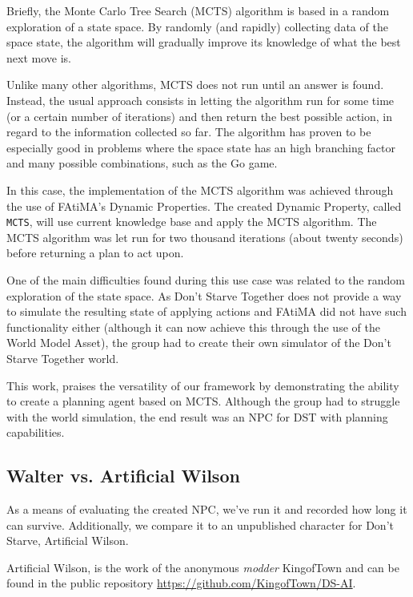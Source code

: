 Briefly, the Monte Carlo Tree Search (MCTS) algorithm is based in a random exploration of a state space.
By randomly (and rapidly) collecting data of the space state, the algorithm will gradually improve its knowledge of what the best next move is.

Unlike many other algorithms, MCTS does not run until an answer is found.
Instead, the usual approach consists in letting the algorithm run for some time (or a certain number of iterations) and then return the best possible action, in regard to the information collected so far.
The algorithm has proven to be especially good in problems where the space state has an high branching factor and many possible combinations, such as the Go game.

In this case, the implementation of the MCTS algorithm was achieved through the use of FAtiMA's Dynamic Properties.
The created Dynamic Property, called \texttt{MCTS}, will use current knowledge base and apply the MCTS algorithm.
The MCTS algorithm was let run for two thousand iterations (about twenty seconds) before returning a plan to act upon.

One of the main difficulties found during this use case was related to the random exploration of the state space.
As Don't Starve Together does not provide a way to simulate the resulting state of applying actions and FAtiMA did not have such functionality either (although it can now achieve this through the use of the World Model Asset), the group had to create their own simulator of the Don't Starve Together world.

This work, praises the versatility of our framework by demonstrating the ability to create a planning agent based on MCTS.
Although the group had to struggle with the world simulation, the end result was an NPC for DST with planning capabilities.

\subsection{Walter vs. Artificial Wilson}

As a means of evaluating the created NPC, we've run it and recorded how long it can survive.
Additionally, we compare it to an unpublished character for Don't Starve, Artificial Wilson.

Artificial Wilson, is the work of the anonymous \textit{modder} KingofTown and can be found in the public repository \href{https://github.com/KingofTown/DS-AI}{https://github.com/KingofTown/DS-AI}.

